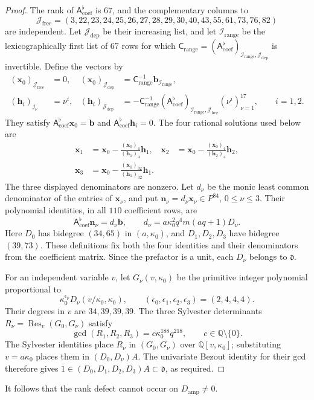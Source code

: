 \documentclass[11pt,a4paper]{article}
\numberwithin{equation}{section}
\theoremstyle{plain}
\theoremstyle{definition}
\theoremstyle{remark}
\begin{document}
\begin{proof}
The rank of $\mathsf A_{\mathrm{coef}}^\flat$ is $67$, and the complementary columns to
\[
 \mathcal J_{\mathrm{free}}
 =(3,22,23,24,25,26,27,28,29,30,40,43,55,61,73,76,82)
\]
are independent. Let $\mathcal J_{\mathrm{dep}}$ be their increasing list,
and let $\mathcal I_{\mathrm{range}}$ be the lexicographically first list
of $67$ rows for which
$\mathsf C_{\mathrm{range}}=
 (\mathsf A_{\mathrm{coef}}^\flat)_{\mathcal I_{\mathrm{range}},\mathcal J_{\mathrm{dep}}}$
is invertible. Define the vectors by
\[
 \begin{aligned}
 (\mathbf x_0)_{\mathcal J_{\mathrm{free}}}&=0,&
 (\mathbf x_0)_{\mathcal J_{\mathrm{dep}}}
       &=\mathsf C_{\mathrm{range}}^{-1}\mathbf b_{\mathcal I_{\mathrm{range}}},\\
 (\mathbf h_i)_{j_\nu}&=\nu^i,&
 (\mathbf h_i)_{\mathcal J_{\mathrm{dep}}}
       &=-\mathsf C_{\mathrm{range}}^{-1}
        (\mathsf A_{\mathrm{coef}}^\flat)_{\mathcal I_{\mathrm{range}},\mathcal J_{\mathrm{free}}}
          (\nu^i)_{\nu=1}^{17},\qquad i=1,2.
 \end{aligned}
\]
They satisfy $\mathsf A_{\mathrm{coef}}^\flat\mathbf x_0=\mathbf b$ and
$\mathsf A_{\mathrm{coef}}^\flat\mathbf h_i=0$. The four rational solutions used below are
\[
 \begin{aligned}
 \mathbf x_1&=\mathbf x_0-
       \frac{(\mathbf x_0)_4}{(\mathbf h_1)_4}\mathbf h_1,&
 \mathbf x_2&=\mathbf x_0-
       \frac{(\mathbf x_0)_4}{(\mathbf h_2)_4}\mathbf h_2,\\
 \mathbf x_3&=\mathbf x_0-
       \frac{(\mathbf x_0)_{32}}{(\mathbf h_1)_{32}}\mathbf h_1.
 \end{aligned}
\]
The three displayed denominators are nonzero. Let $d_\nu$ be the monic
least common denominator of the entries of $\mathbf x_\nu$, and put
$\mathbf n_\nu=d_\nu\mathbf x_\nu\in P^{84}$, $0\le\nu\le3$.
Their polynomial identities, in all $110$ coefficient rows, are
\[
 \mathsf A_{\mathrm{coef}}^\flat\mathbf n_\nu=d_\nu\mathbf b,\qquad
 d_\nu=a\kappa_0^2q^4m(aq+1)D_\nu.
\]
Here $D_0$ has bidegree $(34,65)$ in $(a,\kappa_0)$,
and $D_1,D_2,D_3$ have bidegree $(39,73)$.
These definitions fix both the four identities and their denominators
from the coefficient matrix. Since the prefactor is a unit,
each $D_\nu$ belongs to $\mathfrak d$.

For an independent variable $v$, let $G_\nu(v,\kappa_0)$ be the primitive
integer polynomial proportional to
\[
 \kappa_0^{\epsilon_\nu}D_\nu(v/\kappa_0,\kappa_0),\qquad
 (\epsilon_0,\epsilon_1,\epsilon_2,\epsilon_3)=(2,4,4,4).
\]
Their degrees in $v$ are $34,39,39,39$. The three Sylvester determinants
$R_\nu=\operatorname{Res}_v(G_0,G_\nu)$ satisfy
\[
 \gcd(R_1,R_2,R_3)
       =c\kappa_0^{188}q^{218},\qquad c\in\mathbb Q\setminus\{0\}.
\]
The Sylvester identities place $R_\nu$ in $(G_0,G_\nu)$ over
$\mathbb Q[v,\kappa_0]$; substituting $v=a\kappa_0$ places them in
$(D_0,D_\nu)A$. The univariate Bezout identity for their gcd therefore
gives $1\in(D_0,D_1,D_2,D_3)A\subset\mathfrak d$, as required.
\end{proof}
It follows that the rank defect cannot occur on $D_{\mathrm{amp}}\ne0$.
\end{document}
